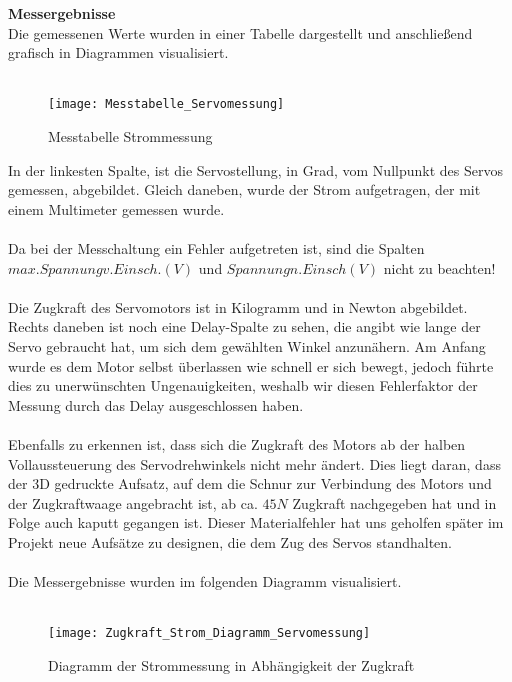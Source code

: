 \documentclass[titlepage,12pt,twoside]{article}
\begin{document}
\hfill \break
\textbf{Messergebnisse}\\
Die gemessenen Werte wurden in einer Tabelle dargestellt und anschließend grafisch in Diagrammen visualisiert. \\
\\
\begin{figure}[H]
	\begin{center}
		\scalebox{1.3}
		{\texttt{[image: Messtabelle\_Servomessung]}}
		\caption{Messtabelle Strommessung}
		\label{fig:Messtabelle_Servomessung}		
	\end{center}
\end{figure}
\hfill \break
In der linkesten Spalte, ist die Servostellung, in Grad, vom Nullpunkt des Servos gemessen, abgebildet. Gleich daneben, wurde 
der Strom aufgetragen, der mit einem Multimeter gemessen wurde. \\
\\
Da bei der Messchaltung ein Fehler aufgetreten ist, sind die Spalten $max. Spannung v. Einsch. (V)$ und $Spannung n. Einsch(V)$
nicht zu beachten! \\
\\
Die Zugkraft des Servomotors ist in Kilogramm und in Newton abgebildet. Rechts daneben ist noch eine Delay-Spalte zu sehen, die
angibt wie lange der Servo gebraucht hat, um sich dem gewählten Winkel anzunähern. Am Anfang wurde es dem Motor selbst überlassen
wie schnell er sich bewegt, jedoch führte dies zu unerwünschten Ungenauigkeiten, weshalb wir diesen Fehlerfaktor der Messung durch 
das Delay ausgeschlossen haben. \\
\\
Ebenfalls zu erkennen ist, dass sich die Zugkraft des Motors ab der halben Vollaussteuerung des Servodrehwinkels nicht mehr ändert.
Dies liegt daran, dass der 3D gedruckte Aufsatz, auf dem die Schnur zur Verbindung des Motors und der Zugkraftwaage angebracht ist,
ab ca. $45N$ Zugkraft nachgegeben hat und in Folge auch kaputt gegangen ist. Dieser Materialfehler hat uns geholfen später im
Projekt neue Aufsätze zu designen, die dem Zug des Servos standhalten. \\
\\
Die Messergebnisse wurden im folgenden Diagramm visualisiert. \\
\\
\begin{figure}[H]
	\begin{center}
		\scalebox{1.2}
		{\texttt{[image: Zugkraft\_Strom\_Diagramm\_Servomessung]}}
		\caption{Diagramm der Strommessung in Abhängigkeit der Zugkraft}
		\label{fig:Zugkraft_Strom_Diagramm_Servomessung}	
	\end{center}
\end{figure}
\end{document}
